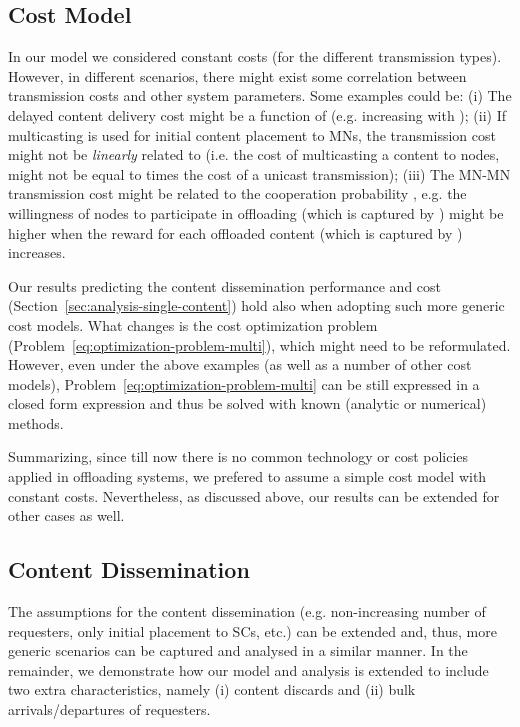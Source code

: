 \documentclass[10pt,conference,letterpaper]{IEEEtran}
\begin{document}
\subsection{Cost Model}
In our model we considered constant costs (for the different transmission types). However, in different scenarios, there might exist some correlation between transmission costs and other system parameters. Some examples could be: (i) The delayed content delivery cost  might be a function of  (e.g. increasing with ); (ii) If multicasting is used for initial content placement to MNs, the transmission cost  might not be \textit{linearly} related to  (i.e. the cost of multicasting a content to  nodes, might not be equal to  times the cost of a unicast transmission); (iii) The MN-MN transmission cost  might be related to the cooperation probability , e.g. the willingness of nodes to participate in offloading (which is captured by ) might be higher when the reward for each offloaded content (which is captured by ) increases.

Our results predicting the content dissemination performance and cost (Section~\ref{sec:analysis-single-content}) hold also when adopting such more generic cost models. What changes is the cost optimization problem (Problem~\ref{eq:optimization-problem-multi}), which might need to be reformulated. However, even under the above examples (as well as a number of other cost models), Problem~\ref{eq:optimization-problem-multi} can be still expressed in a closed form expression and thus be solved with known (analytic or numerical) methods. 

Summarizing, since till now there is no common technology or cost policies applied in offloading systems, we prefered to assume a simple cost model with constant costs. Nevertheless, as discussed above, our results can be extended for other cases as well.


\subsection{Content Dissemination}
The assumptions for the content dissemination (e.g. non-increasing number of requesters, only initial placement to SCs, etc.) can be extended and, thus, more generic scenarios can be captured and analysed in a similar manner. In the remainder, we demonstrate how our model and analysis is extended to include two extra characteristics, namely (i) content discards and (ii) bulk arrivals/departures of requesters.
\end{document}
